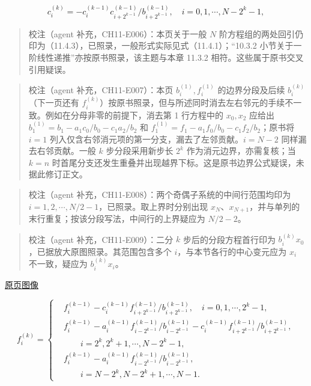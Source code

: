 \documentclass[
  10pt,
  fontset=fandol]{ctexart}
\begin{document}
\[
c_i^{(k)}=-c_i^{(k-1)}c_{i+2^{k-1}}^{(k-1)}/b_{i+2^{k-1}}^{(k-1)},\quad i=0,1,\cdots,N-2^k-1,
\]

\begin{quote}
校注（agent 补充，CH11-E006）：本页关于一般 \(N\) 阶方程组的两处回引仍印为（11.4.3），已照录，一般形式实际见式（11.4.1）；``10.3.2 小节关于一阶线性递推''亦按原书照录，该主题与本章 11.3.2 相符。这些属于原书交叉引用疑误。
\end{quote}

\begin{quote}
校注（agent 补充，CH11-E007）：本页 \(b_i^{(1)},f_i^{(1)}\) 的边界分段及后续 \(b_i^{(k)}\)（下一页还有 \(f_i^{(k)}\)）按原书照录，但与所述同时消去左右邻元的手续不一致。例如在分母非零的前提下，消去第 1 行方程中的 \(x_0,x_2\) 应给出 \(b_1^{(1)}=b_1-a_1c_0/b_0-c_1a_2/b_2\) 和 \(f_1^{(1)}=f_1-a_1f_0/b_0-c_1f_2/b_2\)；原书将 \(i=1\) 列入仅含右邻消元项的第一分支，漏去了左邻贡献。\(i=N-2\) 同样漏去右邻贡献。一般 \(k\) 步分段采用新步长 \(2^k\) 作为消元边界，亦需复核；当 \(k=n\) 时首尾分支还发生重叠并出现越界下标。这是原书边界公式疑误，未据此修订正文。
\end{quote}

\begin{quote}
校注（agent 补充，CH11-E008）：两个奇偶子系统的中间行范围均印为 \(i=1,2,\cdots,N/2-1\)，已照录。取上界时分别出现 \(x_N\)、\(x_{N+1}\)，并与单列的末行重复；按该分段写法，中间行的上界疑应为 \(N/2-2\)。
\end{quote}

\begin{quote}
校注（agent 补充，CH11-E009）：二分 \(k\) 步后的分段方程首行印为 \(b_i^{(k)}x_0\)，已据放大原图照录。其范围包含多个 \(i\)，与本节各行的中心变元应为 \(x_i\) 不一致，疑应为 \(b_i^{(k)}x_i\)。
\end{quote}

\href{../../source-images/pdf-292.jpeg}{原页图像}

\[
f_i^{(k)}=
\left\{
\begin{aligned}
&f_i^{(k-1)}-c_i^{(k-1)}f_{i+2^{k-1}}^{(k-1)}/b_{i+2^{k-1}}^{(k-1)},\quad i=0,1,\cdots,2^k-1,\\
&f_i^{(k-1)}-a_i^{(k-1)}f_{i-2^{k-1}}^{(k-1)}/b_{i-2^{k-1}}^{(k-1)}-c_i^{(k-1)}f_{i+2^{k-1}}^{(k-1)}/b_{i+2^{k-1}}^{(k-1)},\\
&\qquad i=2^k,2^k+1,\cdots,N-2^k-1,\\
&f_i^{(k-1)}-a_i^{(k-1)}f_{i-2^{k-1}}^{(k-1)}/b_{i-2^{k-1}}^{(k-1)},\\
&\qquad i=N-2^k,N-2^k+1,\cdots,N-1.
\end{aligned}
\right.
\]
\end{document}
